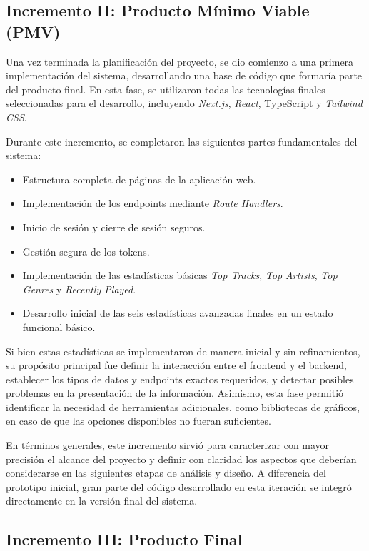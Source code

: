 \subsection*{Incremento II: Producto Mínimo Viable (PMV)}

Una vez terminada la planificación del proyecto, se dio comienzo a una primera implementación del sistema, desarrollando una base de código que formaría parte del producto final. En esta fase, se utilizaron todas las tecnologías finales seleccionadas para el desarrollo, incluyendo \textit{Next.js}, \textit{React}, TypeScript y \textit{Tailwind CSS}.

Durante este incremento, se completaron las siguientes partes fundamentales del sistema:

\setlength{\itemsep}{0pt}
\begin{itemize}
    \item Estructura completa de páginas de la aplicación web.
    \item Implementación de los endpoints mediante \textit{Route Handlers}.
    \item Inicio de sesión y cierre de sesión seguros.
    \item Gestión segura de los tokens.
    \item Implementación de las estadísticas básicas \textit{Top Tracks}, \textit{Top Artists}, \textit{Top Genres} y \textit{Recently Played}.
    \item Desarrollo inicial de las seis estadísticas avanzadas finales en un estado funcional básico.
\end{itemize}

Si bien estas estadísticas se implementaron de manera inicial y sin refinamientos, su propósito principal fue definir la interacción entre el frontend y el backend, establecer los tipos de datos y endpoints exactos requeridos, y detectar posibles problemas en la presentación de la información. Asimismo, esta fase permitió identificar la necesidad de herramientas adicionales, como bibliotecas de gráficos, en caso de que las opciones disponibles no fueran suficientes.

En términos generales, este incremento sirvió para caracterizar con mayor precisión el alcance del proyecto y definir con claridad los aspectos que deberían considerarse en las siguientes etapas de análisis y diseño. A diferencia del prototipo inicial, gran parte del código desarrollado en esta iteración se integró directamente en la versión final del sistema.

\subsection*{Incremento III: Producto Final}

